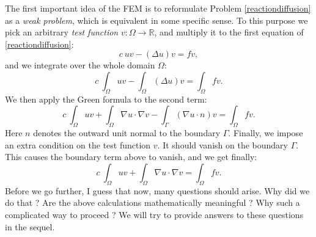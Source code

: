 \documentclass{article}
\begin{document}
The first important idea of the FEM is to reformulate Problem \eqref{reactiondiffusion} as a \emph{weak problem}, which is equivalent in some specific sense. To this purpose we pick an arbitrary \emph{test function} $v : \Omega \rightarrow \mathbb{R}$, and multiply it to the first equation of \eqref{reactiondiffusion}:
\[
c\ u v - (\Delta u) v = f v,
\]
and we integrate over the whole domain $\Omega$:
\[
c\ \int_\Omega u v - \int_\Omega (\Delta u) v = \int_\Omega f v.
\]
We then apply the Green formula to the second term:
\[
c\ \int_\Omega u v + \int_\Omega \nabla u \cdot \nabla v - \int_\Gamma (\nabla u \cdot n) v = \int_\Omega f v.
\]
Here $n$ denotes the outward unit normal to the boundary $\Gamma$. Finally, we impose an extra condition on the test function $v$. It should vanish on the boundary $\Gamma$. This causes the boundary term above to vanish, and we get finally:
\[
c\ \int_\Omega u v + \int_\Omega \nabla u \cdot \nabla v = \int_\Omega f v.
\]
Before we go further, I guess that now, many questions should arise. Why did we do that ? Are the above calculations mathematically meaningful ? Why such a complicated way to proceed ? We will try to provide answers to these questions in the sequel.
\end{document}
